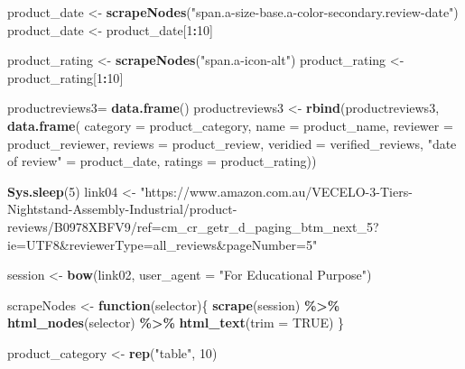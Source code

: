 \documentclass[
]{article}
\newenvironment{Shaded}{\begin{snugshade}}{\end{snugshade}}
\newcommand{\AttributeTok}[1]{\textcolor[rgb]{0.13,0.29,0.53}{#1}}
\newcommand{\ConstantTok}[1]{\textcolor[rgb]{0.56,0.35,0.01}{#1}}
\newcommand{\ControlFlowTok}[1]{\textcolor[rgb]{0.13,0.29,0.53}{\textbf{#1}}}
\newcommand{\DecValTok}[1]{\textcolor[rgb]{0.00,0.00,0.81}{#1}}
\newcommand{\FunctionTok}[1]{\textcolor[rgb]{0.13,0.29,0.53}{\textbf{#1}}}
\newcommand{\NormalTok}[1]{#1}
\newcommand{\OtherTok}[1]{\textcolor[rgb]{0.56,0.35,0.01}{#1}}
\newcommand{\SpecialCharTok}[1]{\textcolor[rgb]{0.81,0.36,0.00}{\textbf{#1}}}
\newcommand{\StringTok}[1]{\textcolor[rgb]{0.31,0.60,0.02}{#1}}
\begin{document}
\begin{Shaded}
\begin{Highlighting}[]
\NormalTok{  product\_date }\OtherTok{\textless{}{-}} \FunctionTok{scrapeNodes}\NormalTok{(}\StringTok{"span.a{-}size{-}base.a{-}color{-}secondary.review{-}date"}\NormalTok{)}
\NormalTok{  product\_date }\OtherTok{\textless{}{-}}\NormalTok{ product\_date[}\DecValTok{1}\SpecialCharTok{:}\DecValTok{10}\NormalTok{]}
  
\NormalTok{  product\_rating }\OtherTok{\textless{}{-}} \FunctionTok{scrapeNodes}\NormalTok{(}\StringTok{"span.a{-}icon{-}alt"}\NormalTok{)}
\NormalTok{  product\_rating }\OtherTok{\textless{}{-}}\NormalTok{ product\_rating[}\DecValTok{1}\SpecialCharTok{:}\DecValTok{10}\NormalTok{]}
  
\NormalTok{  productreviews3}\OtherTok{=} \FunctionTok{data.frame}\NormalTok{()}
\NormalTok{  productreviews3 }\OtherTok{\textless{}{-}} \FunctionTok{rbind}\NormalTok{(productreviews3, }\FunctionTok{data.frame}\NormalTok{(}
                      \AttributeTok{category =}\NormalTok{ product\_category,}
                      \AttributeTok{name =}\NormalTok{ product\_name,}
                      \AttributeTok{reviewer =}\NormalTok{ product\_reviewer,}
                      \AttributeTok{reviews =}\NormalTok{ product\_review,}
                      \AttributeTok{veridied =}\NormalTok{ verified\_reviews,}
                      \StringTok{"date of review"} \OtherTok{=}\NormalTok{ product\_date,}
                      \AttributeTok{ratings =}\NormalTok{ product\_rating))}
  
   \FunctionTok{Sys.sleep}\NormalTok{(}\DecValTok{5}\NormalTok{)}
\NormalTok{link04 }\OtherTok{\textless{}{-}} \StringTok{"https://www.amazon.com.au/VECELO{-}3{-}Tiers{-}Nightstand{-}Assembly{-}Industrial/product{-}reviews/B0978XBFV9/ref=cm\_cr\_getr\_d\_paging\_btm\_next\_5?ie=UTF8\&reviewerType=all\_reviews\&pageNumber=5"}


\NormalTok{  session }\OtherTok{\textless{}{-}} \FunctionTok{bow}\NormalTok{(link02,}
               \AttributeTok{user\_agent =} \StringTok{"For Educational Purpose"}\NormalTok{)}

\NormalTok{  scrapeNodes }\OtherTok{\textless{}{-}} \ControlFlowTok{function}\NormalTok{(selector)\{}
    \FunctionTok{scrape}\NormalTok{(session) }\SpecialCharTok{\%\textgreater{}\%}
      \FunctionTok{html\_nodes}\NormalTok{(selector) }\SpecialCharTok{\%\textgreater{}\%}
      \FunctionTok{html\_text}\NormalTok{(}\AttributeTok{trim =} \ConstantTok{TRUE}\NormalTok{)}
\NormalTok{  \}}

\NormalTok{  product\_category }\OtherTok{\textless{}{-}} \FunctionTok{rep}\NormalTok{(}\StringTok{"table"}\NormalTok{, }\DecValTok{10}\NormalTok{)}


\end{Highlighting}
\end{Shaded}
\end{document}
